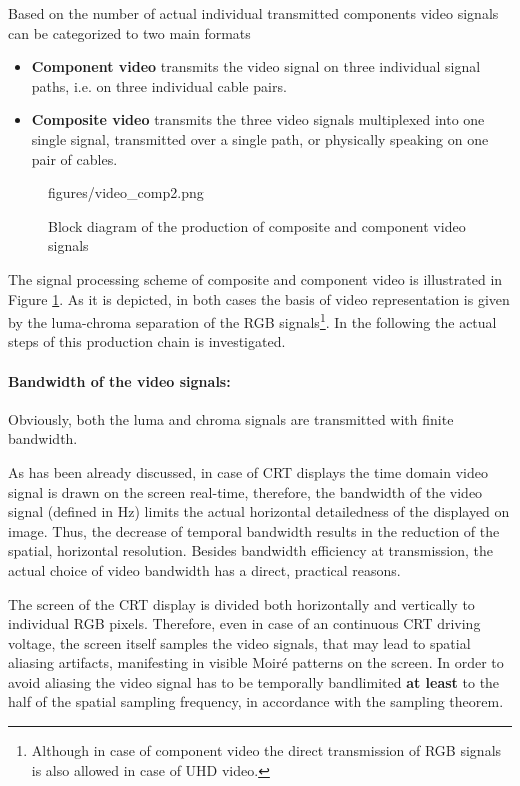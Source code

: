 Based on the number of actual individual transmitted components video signals can be categorized to two main formats 
\begin{itemize}
\item \textbf{Component video} transmits the video signal on three individual signal paths, i.e. on three individual cable pairs.
\item \textbf{Composite video} transmits the three video signals multiplexed into one single signal, transmitted over a single path, or physically speaking on one pair of cables.
\end{itemize}
\begin{figure}[]
	\centering
	\begin{overpic}[width = 0.90\columnwidth ]{figures/video_comp2.png}
	\end{overpic}
	\caption{Block diagram of the production of composite and component video signals}
	\label{Fig:video_components}
\end{figure}
The signal processing scheme of composite and component video is illustrated in Figure \ref{Fig:video_components}.
As it is depicted, in both cases the basis of video representation is given by the luma-chroma separation of the RGB signals\footnote{Although in case of component video the direct transmission of RGB signals is also allowed in case of UHD video.}.
In the following the actual steps of this production chain is investigated.

\vspace{3mm}
\paragraph{Bandwidth of the video signals:}
Obviously, both the luma and chroma signals are transmitted with finite bandwidth.

As has been already discussed, in case of CRT displays the time domain video signal is drawn on the screen real-time, therefore, the bandwidth of the video signal (defined in $\mathrm{Hz}$) limits the actual horizontal detailedness of the displayed on image.
Thus, the decrease of temporal bandwidth results in the reduction of the spatial, horizontal resolution.
Besides bandwidth efficiency at transmission, the actual choice of video bandwidth has a direct, practical reasons.

The screen of the CRT display is divided both horizontally and vertically to individual RGB pixels.
Therefore, even in case of an continuous CRT driving voltage, the screen itself samples the video signals, that may lead to spatial aliasing artifacts, manifesting in visible Moiré patterns on the screen.
In order to avoid aliasing the video signal has to be temporally bandlimited \textbf{at least} to the half of the spatial sampling frequency, in accordance with the sampling theorem.

